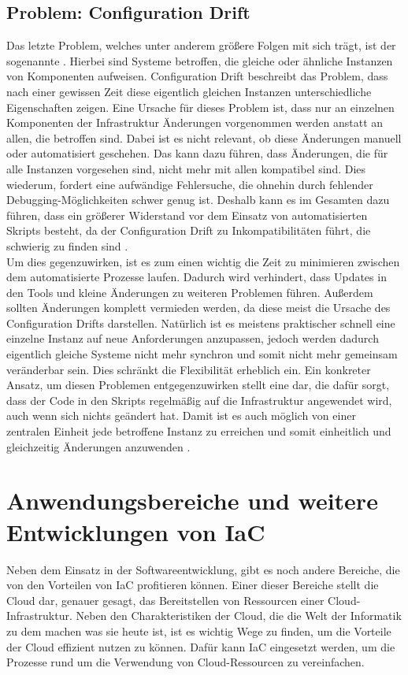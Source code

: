\documentclass[biblatex]{lni}
\begin{document}
\subsection{Problem: Configuration Drift}
Das letzte Problem, welches unter anderem größere Folgen mit sich trägt, ist der sogenannte . Hierbei sind Systeme betroffen, die gleiche oder ähnliche Instanzen von Komponenten aufweisen. Configuration Drift beschreibt das Problem, dass nach einer gewissen Zeit diese eigentlich gleichen Instanzen unterschiedliche Eigenschaften zeigen. Eine Ursache für dieses Problem ist, dass nur an einzelnen Komponenten der Infrastruktur Änderungen vorgenommen werden anstatt an allen, die betroffen sind. Dabei ist es nicht relevant, ob diese Änderungen manuell oder automatisiert geschehen. Das kann dazu führen, dass Änderungen, die für alle Instanzen vorgesehen sind, nicht mehr mit allen kompatibel sind. Dies wiederum, fordert eine aufwändige Fehlersuche, die ohnehin durch fehlender Debugging-Möglichkeiten schwer genug ist. Deshalb kann es im Gesamten dazu führen, dass ein größerer Widerstand vor dem Einsatz von automatisierten Skripts besteht, da der Configuration Drift zu Inkompatibilitäten führt, die schwierig zu finden sind \cite[S. 17-20]{Morris.December2020}.\\
Um dies gegenzuwirken, ist es zum einen wichtig die Zeit zu minimieren zwischen dem automatisierte Prozesse laufen. Dadurch wird verhindert, dass Updates in den Tools und kleine Änderungen zu weiteren Problemen führen. Außerdem sollten  Änderungen komplett vermieden werden, da diese meist die Ursache des Configuration Drifts darstellen. Natürlich ist es meistens praktischer schnell eine einzelne Instanz auf neue Anforderungen anzupassen, jedoch werden dadurch eigentlich gleiche Systeme nicht mehr synchron und somit nicht mehr gemeinsam veränderbar sein. Dies schränkt die Flexibilität erheblich ein. Ein konkreter Ansatz, um diesen Problemen entgegenzuwirken stellt eine  dar, die dafür sorgt, dass der Code in den Skripts regelmäßig auf die Infrastruktur angewendet wird, auch wenn sich nichts geändert hat. Damit ist es auch möglich von einer zentralen Einheit jede betroffene Instanz zu erreichen und somit einheitlich und gleichzeitig Änderungen anzuwenden \cite[S. 349-351]{Morris.December2020}.

\section{Anwendungsbereiche und weitere Entwicklungen von IaC}
Neben dem Einsatz in der Softwareentwicklung, gibt es noch andere Bereiche, die von den Vorteilen von IaC profitieren können. Einer dieser Bereiche stellt die Cloud dar, genauer gesagt, das Bereitstellen von Ressourcen einer Cloud-Infrastruktur. Neben den Charakteristiken der Cloud, die die Welt der Informatik zu dem machen was sie heute ist, ist es wichtig Wege zu finden, um die Vorteile der Cloud effizient nutzen zu können. Dafür kann IaC eingesetzt werden, um die Prozesse rund um die Verwendung von Cloud-Ressourcen zu vereinfachen.
\end{document}
